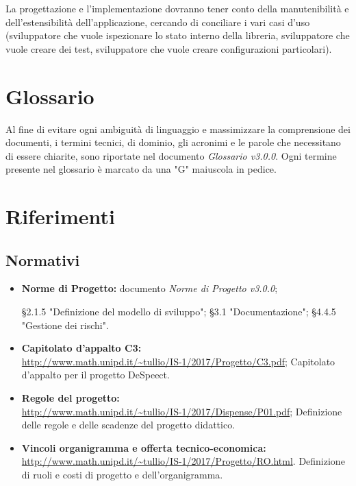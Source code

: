 \documentclass[../PianodiProgetto.tex]{subfiles}
\begin{document}
	\noindent La progettazione e l'implementazione dovranno tener conto della manutenibilità e dell'estensibilità dell'applicazione, cercando di conciliare i vari casi d'uso (sviluppatore che vuole ispezionare lo stato interno della libreria, sviluppatore che vuole creare dei test, sviluppatore che vuole creare configurazioni particolari). 
	
	\section{Glossario}
	Al fine di evitare ogni ambiguità di linguaggio e massimizzare la comprensione dei documenti, i termini tecnici, di dominio, gli acronimi e le parole che necessitano di essere chiarite, sono riportate nel documento \textit{Glossario v3.0.0}. Ogni termine presente nel glossario è marcato da una "G" maiuscola in pedice.
	
	\section{Riferimenti}
	
	\subsection*{Normativi}
	\begin{itemize}
		\item \textbf{Norme di Progetto:} documento \textit{Norme di Progetto v3.0.0};
		\begin{itemize}
			\subitem §2.1.5 "Definizione del modello di sviluppo";
			\subitem §3.1 "Documentazione";
			\subitem §4.4.5 "Gestione dei rischi".
		\end{itemize}
		\item \textbf{Capitolato d'appalto C3:} \\ \url{http://www.math.unipd.it/~tullio/IS-1/2017/Progetto/C3.pdf};
		\subitem Capitolato d'appalto per il progetto DeSpeect.
		\item \textbf{Regole del progetto:}\\ \url{http://www.math.unipd.it/~tullio/IS-1/2017/Dispense/P01.pdf};
		\subitem Definizione delle regole e delle scadenze del progetto didattico.
		\item \textbf{Vincoli organigramma e offerta tecnico-economica:}\\ \url{http://www.math.unipd.it/~tullio/IS-1/2017/Progetto/RO.html}.
		\subitem Definizione di ruoli e costi di progetto e dell'organigramma.
	\end{itemize}
	
\end{document}
